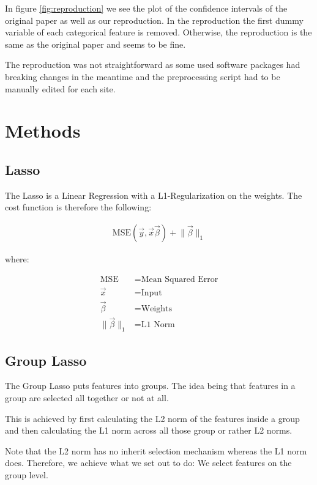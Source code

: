 \documentclass[twoside,twocolumn]{article}
\begin{document}
In figure \ref{fig:reproduction} we see the plot of the confidence intervals of the original paper as well as our reproduction.
In the reproduction the first dummy variable of each categorical feature is removed.
Otherwise, the reproduction is the same as the original paper and seems to be fine.

The reproduction was not straightforward as some used software packages had breaking changes in the meantime \cite{blockcv_issue} and the preprocessing script had to be manually edited for each site.

\section{Methods} \label{sec:method}

\subsection{Lasso}

The Lasso is a Linear Regression with a L1-Regularization on the weights.
The cost function is therefore the following:

\begin{align}
    \text{MSE}(\vec{y}, \vec{x}\vec{\beta}) + \lVert\vec{\beta}\rVert_1
\end{align}

where:

\begin{align}
    \text{MSE} & = \text{Mean Squared Error} \\
    \vec{x} & = \text{Input} \\
    \vec{\beta} & = \text{Weights} \\
    \lVert\vec{\beta}\rVert_1 & = \text{L1 Norm}
\end{align}

\subsection{Group Lasso}

The Group Lasso puts features into groups.
The idea being that features in a group are selected all together or not at all.

This is achieved by first calculating the L2 norm of the features inside a group and then calculating the L1 norm across all those group or rather L2 norms.

Note that the L2 norm has no inherit selection mechanism whereas the L1 norm does.
Therefore, we achieve what we set out to do: We select features on the group level.
\end{document}
